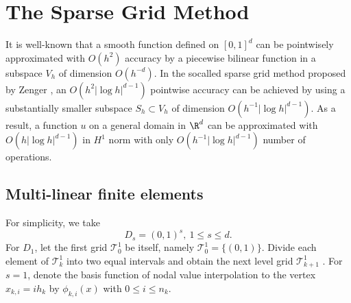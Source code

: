 \chapter{The Sparse Grid Method}
It is well-known that a smooth function defined on $[0,1]^d$
can be pointwisely approximated with $O(h^2)$ accuracy by
a piecewise bilinear function in a subspace $V_h$ of dimension $O(h^{-d})$.
In the socalled sparse grid method proposed by
Zenger \cite{zenger1990sparse}, an $O(h^2|\log h|^{d-1})$ pointwise
accuracy can be achieved by using a  substantially smaller
subspace $S_h\subset V_h$ of dimension $O(h^{-1}|\log h|^{d-1})$.
As a result, a function $u$ on a general domain in $\R^d$
can be approximated with $O(h|\log h|^{d-1})$ in $H^1$ norm
with only $O(h^{-1}|\log h|^{d-1})$ number of operations.

\section{Multi-linear finite elements}

For simplicity, we take
$$
D_s=(0,1)^s,\ 1\leq s\leq d.
$$
For $D_1$, let the first grid $\mathcal{T}_0^1$ be itself, namely $\mathcal T_0^1=\{(0, 1)\}$. Divide each
element of $\mathcal{T}_k^1$ into two equal intervals and obtain the
next level grid $\mathcal{T}_{k+1}^1$ . For $s=1$, denote the basis function of nodal value interpolation to the vertex $x_{k,i}=ih_k$ by $\phi_{k,i}(x)$ with $0\leq i\leq n_k$.   
\begin{figure}[!ht]
\begin{center}
\end{center}
\end{figure}

